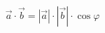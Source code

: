 \documentclass[preview]{standalone}
\begin{document}
\begin{align*}
\vec{a} \cdot \vec{b} = |\vec{a}| \cdot |\vec{b}| \cdot \cos\varphi
\end{align*}
\end{document}
